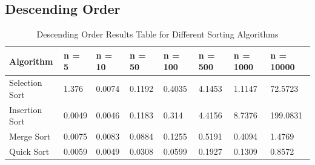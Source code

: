 \subsection{Descending Order}
\begin{table}[ht]
  \centering
  \caption{Descending Order Results Table for Different Sorting Algorithms}
  \begin{tabular}[t]{|l| l l l l l l l|} 
  \hline
  Algorithm & n = 5 & n = 10 & n = 50 & n = 100 & n = 500 & n = 1000 & n = 10000\\ [0.5ex] 
  \hline
  Selection Sort & 1.376 &	0.0074 & 0.1192 & 0.4035 & 4.1453 & 1.1147 & 72.5723 \\ 
  \hline
  Insertion Sort &  0.0049 & 0.0046	& 0.1183	& 0.314 & 	4.4156	& 8.7376	& 199.0831\\
  \hline
  Merge Sort & 0.0075 &	0.0083	& 0.0884	& 0.1255	& 0.5191	& 0.4094	& 1.4769\\
  \hline
  Quick Sort & 0.0059	& 0.0049	& 0.0308	& 0.0599	& 0.1927	& 0.1309	& 0.8572\\
   \hline
  \end{tabular}
\end{table}

\begin{figure}[!ht]
	\centerline{}
	\label{fig:figure1}
\end{figure}
